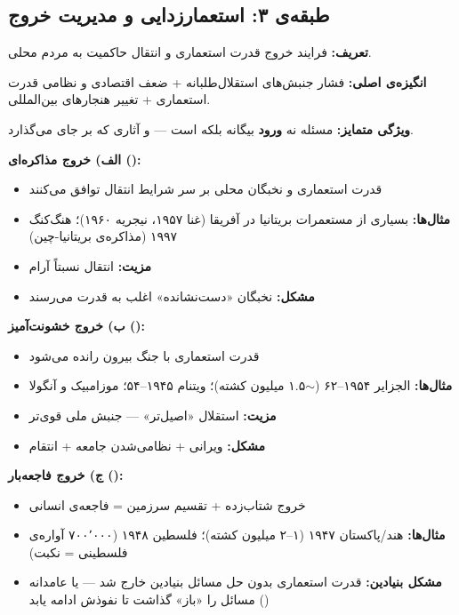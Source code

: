 \subsection{طبقه‌ی ۳: استعمارزدایی و مدیریت خروج}
\label{sec:tax-type3}

\begin{tcolorbox}[casebox, title={تعریف و ویژگی‌ها}]
\textbf{تعریف:} فرایند خروج قدرت استعماری و انتقال حاکمیت به مردم محلی.

\textbf{انگیزه‌ی اصلی:} فشار جنبش‌های استقلال‌طلبانه + ضعف اقتصادی و
نظامی قدرت استعماری + تغییر هنجارهای بین‌المللی.

\textbf{ویژگی متمایز:} مسئله نه \textbf{ورود} بیگانه بلکه  است — و آثاری که بر جای می‌گذارد.
\end{tcolorbox}

\begin{tcolorbox}[wavebox, title={سه شکل استعمارزدایی}]

\textbf{الف) خروج مذاکره‌ای ():}
\begin{itemize}
\item قدرت استعماری و نخبگان محلی بر سر شرایط انتقال توافق می‌کنند
\item \textbf{مثال‌ها:} بسیاری از مستعمرات بریتانیا در آفریقا (غنا ۱۹۵۷،
  نیجریه ۱۹۶۰)؛ هنگ‌کنگ ۱۹۹۷ (مذاکره‌ی بریتانیا-چین)
\item \textbf{مزیت:} انتقال نسبتاً آرام
\item \textbf{مشکل:} نخبگان «دست‌نشانده» اغلب به قدرت می‌رسند
\end{itemize}

\tcblower

\textbf{ب) خروج خشونت‌آمیز ():}
\begin{itemize}
\item قدرت استعماری با جنگ بیرون رانده می‌شود
\item \textbf{مثال‌ها:} الجزایر ۱۹۵۴–۶۲ ($\sim$۱.۵ میلیون کشته)؛
  ویتنام ۱۹۴۵–۵۴؛ موزامبیک و آنگولا
\item \textbf{مزیت:} استقلال «اصیل‌تر» — جنبش ملی قوی‌تر
\item \textbf{مشکل:} ویرانی + نظامی‌شدن جامعه + انتقام
\end{itemize}

\tcblower

\textbf{ج) خروج فاجعه‌بار ():}
\begin{itemize}
\item خروج شتاب‌زده + تقسیم سرزمین = فاجعه‌ی انسانی
\item \textbf{مثال‌ها:} هند/پاکستان ۱۹۴۷ (۱–۲ میلیون کشته)؛ فلسطین
  ۱۹۴۸ (۷۰۰٬۰۰۰ آواره‌ی فلسطینی = نکبت)
\item \textbf{مشکل بنیادین:} قدرت استعماری بدون حل مسائل بنیادین خارج
  شد — یا عامدانه مسائل را «باز» گذاشت تا نفوذش ادامه یابد
  ()
\end{itemize}
\end{tcolorbox}

